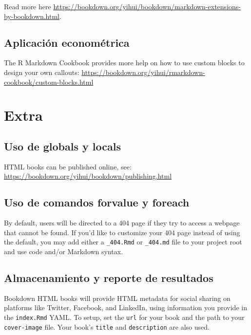 \documentclass[
]{book}
\theoremstyle{definition}
\theoremstyle{definition}
\theoremstyle{definition}
\theoremstyle{definition}
\theoremstyle{remark}
\begin{document}
Read more here \url{https://bookdown.org/yihui/bookdown/markdown-extensions-by-bookdown.html}.

\hypertarget{aplicaciuxf3n-economuxe9trica}{%
\section{Aplicación econométrica}\label{aplicaciuxf3n-economuxe9trica}}

The R Markdown Cookbook provides more help on how to use custom blocks to design your own callouts: \url{https://bookdown.org/yihui/rmarkdown-cookbook/custom-blocks.html}

\hypertarget{extra}{%
\chapter{Extra}\label{extra}}

\hypertarget{uso-de-globals-y-locals}{%
\section{Uso de globals y locals}\label{uso-de-globals-y-locals}}

HTML books can be published online, see: \url{https://bookdown.org/yihui/bookdown/publishing.html}

\hypertarget{uso-de-comandos-forvalue-y-foreach}{%
\section{Uso de comandos forvalue y foreach}\label{uso-de-comandos-forvalue-y-foreach}}

By default, users will be directed to a 404 page if they try to access a webpage that cannot be found. If you'd like to customize your 404 page instead of using the default, you may add either a \texttt{\_404.Rmd} or \texttt{\_404.md} file to your project root and use code and/or Markdown syntax.

\hypertarget{almacenamiento-y-reporte-de-resultados}{%
\section{Almacenamiento y reporte de resultados}\label{almacenamiento-y-reporte-de-resultados}}

Bookdown HTML books will provide HTML metadata for social sharing on platforms like Twitter, Facebook, and LinkedIn, using information you provide in the \texttt{index.Rmd} YAML. To setup, set the \texttt{url} for your book and the path to your \texttt{cover-image} file. Your book's \texttt{title} and \texttt{description} are also used.
\end{document}
